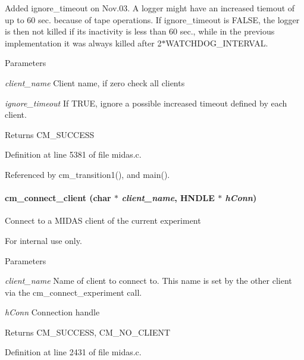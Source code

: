 Added ignore\_\-timeout on Nov.03. A logger might have an increased tiemout of up to 60 sec. because of tape operations. If ignore\_\-timeout is FALSE, the logger is then not killed if its inactivity is less than 60 sec., while in the previous implementation it was always killed after 2$\ast$WATCHDOG\_\-INTERVAL. 
\begin{DoxyParams}{Parameters}
\item[{\em client\_\-name}]Client name, if zero check all clients \item[{\em ignore\_\-timeout}]If TRUE, ignore a possible increased timeout defined by each client. \end{DoxyParams}
\begin{DoxyReturn}{Returns}
CM\_\-SUCCESS 
\end{DoxyReturn}


Definition at line 5381 of file midas.c.

Referenced by cm\_\-transition1(), and main().
\paragraph[{cm\_\-connect\_\-client}]{ cm\_\-connect\_\-client (char $\ast$ {\em client\_\-name}, \/  HNDLE $\ast$ {\em hConn})}\hfill\label{group__cmfunctionc_ga6a8a21234c7ce94bdf26bbcbcf778a39}
Connect to a MIDAS client of the current experiment \begin{DoxyInternal}{For internal use only.}

\begin{DoxyParams}{Parameters}
\item[{\em client\_\-name}]Name of client to connect to. This name is set by the other client via the cm\_\-connect\_\-experiment call. \item[{\em hConn}]Connection handle \end{DoxyParams}
\begin{DoxyReturn}{Returns}
CM\_\-SUCCESS, CM\_\-NO\_\-CLIENT 
\end{DoxyReturn}
\end{DoxyInternal}


Definition at line 2431 of file midas.c.
